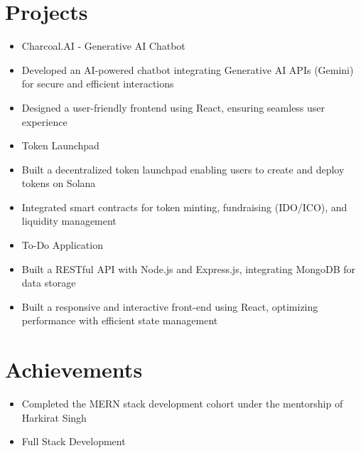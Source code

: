 \documentclass[10pt]{article}
\begin{document}
\section*{Projects}
\vspace{0.05cm}
\begin{itemize}[leftmargin=0.5cm, itemsep=2pt]

  \item Charcoal.AI - Generative AI Chatbot

  \item Developed an AI-powered chatbot integrating Generative AI APIs (Gemini) for secure and efficient interactions

  \item Designed a user-friendly frontend using React, ensuring seamless user experience

  \item Token Launchpad

  \item Built a decentralized token launchpad enabling users to create and deploy tokens on Solana

  \item Integrated smart contracts for token minting, fundraising (IDO/ICO), and liquidity management

  \item To-Do Application

  \item Built a RESTful API with Node.js and Express.js, integrating MongoDB for data storage

  \item Built a responsive and interactive front-end using React, optimizing performance with efficient state management

\end{itemize}





\section*{Achievements}
\vspace{0.05cm}
\begin{itemize}[leftmargin=0.5cm, itemsep=2pt]

  \item Completed the MERN stack development cohort under the mentorship of Harkirat Singh

  \item Full Stack Development

\end{itemize}
\end{document}
